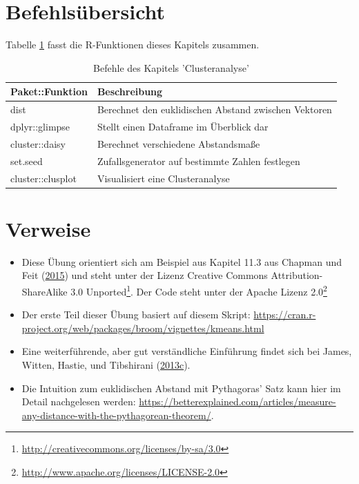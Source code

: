 \documentclass[12pt,ngerman,]{book}
\let\rmarkdownfootnote\footnote%
\def\footnote{\protect\rmarkdownfootnote}
\renewcommand{\href}[2]{#2\footnote{\url{#1}}}
\theoremstyle{definition}
\theoremstyle{definition}
\theoremstyle{remark}
\begin{document}
\section{Befehlsübersicht}\label{befehlsubersicht-9}

Tabelle \ref{tab:befehle-cluster} fasst die R-Funktionen dieses Kapitels
zusammen.

\begin{table}

\caption{\label{tab:befehle-cluster}Befehle des Kapitels 'Clusteranalyse'}
\centering
\begin{tabular}[t]{l|l}
\hline
Paket::Funktion & Beschreibung\\
\hline
dist & Berechnet den euklidischen Abstand zwischen Vektoren\\
\hline
dplyr::glimpse & Stellt einen Dataframe im Überblick dar\\
\hline
cluster::daisy & Berechnet verschiedene Abstandsmaße\\
\hline
set.seed & Zufallsgenerator auf bestimmte Zahlen festlegen\\
\hline
cluster::clusplot & Visualisiert eine Clusteranalyse\\
\hline
\end{tabular}
\end{table}

\section{Verweise}\label{verweise-5}

\begin{itemize}
\item
  Diese Übung orientiert sich am Beispiel aus Kapitel 11.3 aus Chapman
  und Feit (\protect\hyperlink{ref-Chapman2015}{2015}) und steht unter
  der Lizenz
  \href{http://creativecommons.org/licenses/by-sa/3.0}{Creative Commons
  Attribution-ShareAlike 3.0 Unported}. Der Code steht unter der
  \href{http://www.apache.org/licenses/LICENSE-2.0}{Apache Lizenz 2.0}
\item
  Der erste Teil dieser Übung basiert auf diesem Skript:
  \url{https://cran.r-project.org/web/packages/broom/vignettes/kmeans.html}
\item
  Eine weiterführende, aber gut verständliche Einführung findet sich bei
  James, Witten, Hastie, und Tibshirani
  (\protect\hyperlink{ref-james2013introduction}{2013}\protect\hyperlink{ref-james2013introduction}{c}).
\item
  Die Intuition zum euklidischen Abstand mit Pythagoras' Satz kann hier
  im Detail nachgelesen werden:
  \url{https://betterexplained.com/articles/measure-any-distance-with-the-pythagorean-theorem/}.
\end{itemize}
\end{document}
